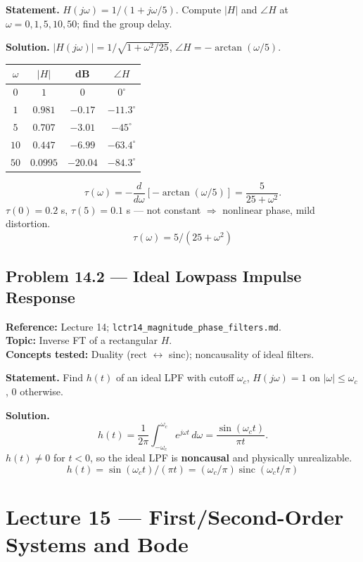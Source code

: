 \documentclass[11pt]{article}
\newcommand{\sinc}{\operatorname{sinc}}
\begin{document}
\textbf{Statement.} $H(j\omega) = 1/(1+j\omega/5)$. Compute $|H|$ and $\angle H$ at $\omega = 0, 1, 5, 10, 50$; find the group delay.

\textbf{Solution.}
$|H(j\omega)| = 1/\sqrt{1+\omega^2/25}$, $\angle H = -\arctan(\omega/5)$.
\begin{center}
\begin{tabular}{|c|c|c|c|}
\hline
$\omega$ & $|H|$ & dB & $\angle H$\\
\hline
$0$ & $1$ & $0$ & $0^\circ$\\
$1$ & $0.981$ & $-0.17$ & $-11.3^\circ$\\
$5$ & $0.707$ & $-3.01$ & $-45^\circ$\\
$10$ & $0.447$ & $-6.99$ & $-63.4^\circ$\\
$50$ & $0.0995$ & $-20.04$ & $-84.3^\circ$\\
\hline
\end{tabular}
\end{center}
\[
\tau(\omega) = -\frac{d}{d\omega}\left[-\arctan(\omega/5)\right] = \frac{5}{25+\omega^2}.
\]
$\tau(0)=0.2$ s, $\tau(5)=0.1$ s --- not constant $\Rightarrow$ nonlinear phase, mild distortion.
\[
\boxed{\,\tau(\omega) = 5/(25+\omega^2)\,}
\]

\subsection{Problem 14.2 --- Ideal Lowpass Impulse Response}
\textbf{Reference:} Lecture 14; \texttt{lctr14\_magnitude\_phase\_filters.md}.\\
\textbf{Topic:} Inverse FT of a rectangular $H$.\\
\textbf{Concepts tested:} Duality (rect $\leftrightarrow$ sinc); noncausality of ideal filters.

\textbf{Statement.} Find $h(t)$ of an ideal LPF with cutoff $\omega_c$, $H(j\omega) = 1$ on $|\omega|\le\omega_c$, $0$ otherwise.

\textbf{Solution.}
\[
h(t) = \frac{1}{2\pi}\int_{-\omega_c}^{\omega_c} e^{j\omega t}\,d\omega = \frac{\sin(\omega_c t)}{\pi t}.
\]
$h(t)\ne 0$ for $t<0$, so the ideal LPF is \textbf{noncausal} and physically unrealizable.
\[
\boxed{\,h(t) = \sin(\omega_c t)/(\pi t) = (\omega_c/\pi)\sinc(\omega_c t/\pi)\,}
\]

\section{Lecture 15 --- First/Second-Order Systems and Bode}
\end{document}
